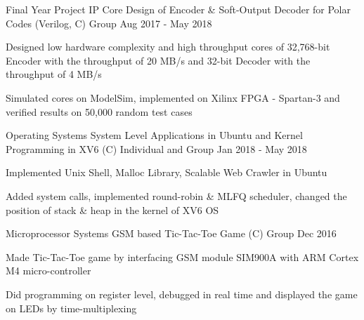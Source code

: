
\begin{cventries}
	\cventry 
	{Final Year Project}
	{IP Core Design of Encoder \& Soft-Output Decoder for Polar Codes  (Verilog, C)}
	{Group}
	{Aug 2017 - May 2018}
	{
		\begin{cvitems}
			\item {Designed low hardware complexity and high throughput cores of 32,768-bit Encoder with the throughput of 20 MB/s and 32-bit Decoder with the throughput of 4 MB/s}
			\item {Simulated cores on ModelSim, implemented on Xilinx FPGA - Spartan-3 and verified results on 50,000 random test cases}
		\end{cvitems}		
	}
	
	\cventry 
	{Operating Systems}
	{System Level Applications in Ubuntu and Kernel Programming in XV6 (C)}
	{Individual and Group}
	{Jan 2018 - May 2018}
	{	\begin{cvitems}
			\item {Implemented Unix Shell, Malloc Library, Scalable Web Crawler in Ubuntu}
			\item {Added system calls, implemented round-robin \& MLFQ scheduler, changed the position of stack \& heap in the kernel of XV6 OS} %
		\end{cvitems}
	}
	
%	
%	
	\cventry 
	{Microprocessor Systems}
	{GSM based Tic-Tac-Toe Game (C)}
	{Group}
	{Dec 2016}
	{
		\begin{cvitems}
			\item {Made Tic-Tac-Toe game by interfacing GSM module SIM900A with ARM Cortex M4 micro-controller}
			\item {Did programming on register level, debugged in real time and displayed the game on LEDs by time-multiplexing} 
		\end{cvitems}		
	}
	

\end{cventries}

